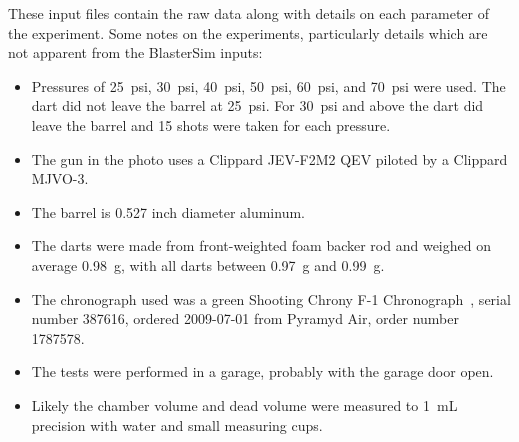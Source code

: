 These input files contain the raw data along with details on each parameter of the experiment.
Some notes on the experiments, particularly details which are not apparent from the BlasterSim inputs:

\begin{itemize}
\item Pressures of 25~psi, 30~psi, 40~psi, 50~psi, 60~psi, and 70~psi were used.
The dart did not leave the barrel at 25~psi. %
For 30~psi and above the dart did leave the barrel and 15 shots were taken for each pressure. %
\item The gun in the photo uses a Clippard JEV-F2M2 QEV piloted by a Clippard MJVO-3.
\item The barrel is 0.527 inch diameter aluminum.
\item The darts were made from front-weighted foam backer rod and weighed on average 0.98~g, with all darts between 0.97~g and 0.99~g. %
\item The chronograph used was a green Shooting Chrony F-1 Chronograph~\cite{shooting_chrony_inc_users_2016}, serial number 387616, ordered 2009-07-01 from Pyramyd Air, order number 1787578. %
\item The tests were performed in a garage, probably with the garage door open.
\item Likely the chamber volume and dead volume were measured to 1~mL precision with water and small measuring cups.
\end{itemize}
